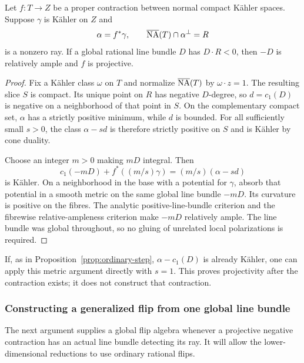 \begin{lemma}\label{repair:lem:polarization}
Let $f:T\to Z$ be a proper contraction between normal compact
K\"ahler spaces. Suppose $\gamma$ is K\"ahler on $Z$ and
\[
 \alpha=f^*\gamma,\qquad
 \overline{\mathrm{NA}}(T)\cap\alpha^\perp=R
\]
is a nonzero ray. If a global rational line bundle $D$ has
$D\cdot R<0$, then $-D$ is relatively ample and $f$ is projective.
\end{lemma}
\begin{proof}
Fix a K\"ahler class $\omega$ on $T$ and normalize $\overline{\mathrm{NA}}(T)$ by
$\omega\cdot z=1$. The resulting slice $S$ is compact. Its unique
point on $R$ has negative $D$-degree, so $d=c_1(D)$ is negative on
a neighborhood of that point in $S$. On the complementary compact
set, $\alpha$ has a strictly positive minimum, while $d$ is bounded.
For all sufficiently small $s>0$, the class $\alpha-sd$ is therefore
strictly positive on $S$ and is K\"ahler by cone duality.

Choose an integer $m>0$ making $mD$ integral. Then
\[
 c_1(-mD)+f^*((m/s)\gamma)=(m/s)(\alpha-sd)
\]
is K\"ahler. On a neighborhood in the base with a potential for
$\gamma$, absorb that potential in a smooth metric on the same global
line bundle $-mD$. Its curvature is positive on the fibres. The analytic
positive-line-bundle criterion and the fibrewise relative-ampleness
criterion make $-mD$ relatively ample. The line bundle was global
throughout, so no gluing of unrelated local polarizations is required.
\end{proof}

If, as in Proposition~\ref{prop:ordinary-step}, $\alpha-c_1(D)$ is already K\"ahler,
one can apply this metric argument directly with $s=1$.
This proves projectivity after the contraction exists; it does not
construct that contraction.

\subsubsection{Constructing a generalized flip from one global line bundle}

The next argument supplies a global flip algebra whenever a projective
negative contraction has an actual line bundle detecting its ray. It will
allow the lower-dimensional reductions to use ordinary rational flips.

